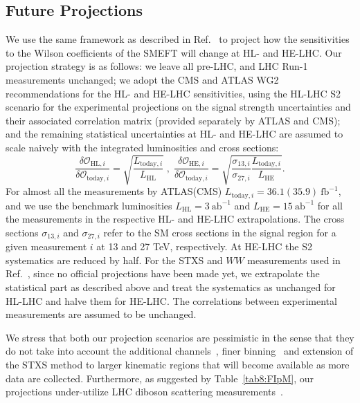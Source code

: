 \documentclass[../report.tex]{subfiles}
\begin{document}
\subsection{Future Projections}
\label{sec8:proj}
We use the same framework as described in Ref.~\cite{Ellis:2018gqa} to project how the sensitivities to the Wilson coefficients of the SMEFT will change at HL- and HE-LHC. Our projection strategy is as follows:
we leave all pre-LHC, and LHC Run-1 measurements unchanged; we adopt the CMS and ATLAS WG2 recommendations for the HL- and HE-LHC sensitivities, using the HL-LHC S2 scenario for the experimental projections on the signal strength uncertainties and their associated correlation matrix (provided separately by ATLAS and CMS);
and the remaining statistical uncertainties at HL- and HE-LHC are assumed to scale naively with the integrated luminosities and cross sections:
\begin{equation}
\frac{\delta\mathcal{O}_{\text{HL}, i}}{\delta\mathcal{O}_{\text{today}, i}} = \sqrt{\frac{L_{\text{today}, i}}{L_{\text{HL}}}} \; , \;
\frac{\delta\mathcal{O}_{\text{HE}, i}}{\delta\mathcal{O}_{\text{today}, i}} = \sqrt{\frac{\sigma_{13, i}}{\sigma_{27, i}} \frac{L_{\text{today}, i}}{L_{\text{HE}}}}  . \nonumber
\end{equation}
For almost all the measurements by ATLAS(CMS) $L_{\text{today}, i} = 36.1(35.9)~\text{fb}^{-1}$,
and we use the benchmark luminosities $L_{\text{HL}} = 3~\text{ab}^{-1}$ and $L_{\text{HE}} = 15~\text{ab}^{-1}$ for all the measurements in the respective HL- and HE-LHC extrapolations.
The cross sections $\sigma_{13, i}$ and $\sigma_{27, i}$ refer to the SM cross sections in the signal region for a given measurement $i$ at 13 and 27 TeV, respectively. At HE-LHC the S2 systematics are reduced by half. For the STXS and $WW$ measurements used in Ref.~\cite{Ellis:2018gqa}, since no official projections have been made yet, we extrapolate the statistical part as described above and treat the systematics as unchanged for HL-LHC and halve them for HE-LHC. The correlations between experimental measurements are assumed to be unchanged.

We stress that both our projection scenarios are pessimistic in the sense that they do not take into account the additional channels~\cite{gilbert:talk}, finer binning~\cite{deFlorian:2016spz, Hays:2290628, ATLAS-CONF-2017-047} and extension of the STXS method to larger kinematic regions that will become available as more data are collected.
Furthermore, as suggested by Table~\ref{tab8:FIpM}, our projections under-utilize LHC diboson scattering measurements~\cite{Azatov:2017kzw, Franceschini:2017xkh, Dawson:2018dcd}. 
\end{document}
